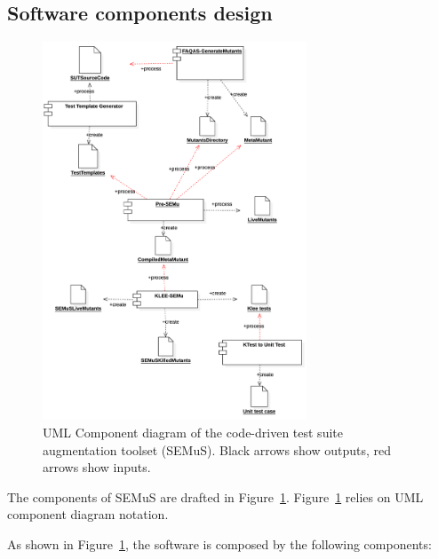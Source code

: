 \subsection{Software components design}
\label{sec:component:design:semus}

\begin{figure}[tb]
  \centering
  \includegraphics[width=0.7\textwidth]{images/semus-component.pdf}
      \caption{UML Component diagram of the code-driven test suite augmentation toolset (SEMuS). Black arrows show outputs, red arrows show inputs.}
      \label{fig:component_diagram_semus}
\end{figure}


The components of SEMuS are drafted in Figure~\ref{fig:component_diagram_semus}. Figure~\ref{fig:component_diagram_semus} relies on UML component diagram notation.

As shown in Figure~\ref{fig:component_diagram_semus}, the software is composed by the following components:

